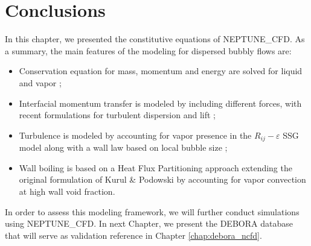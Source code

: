 \section{Conclusions}

In this chapter, we presented the constitutive equations of NEPTUNE\_CFD. As a summary, the main features of the modeling for dispersed bubbly flows are:

\begin{itemize}
\item Conservation equation for mass, momentum and energy are solved for liquid and vapor ;
\item Interfacial momentum transfer is modeled by including different forces, with recent formulations for turbulent dispersion and lift ;
\item Turbulence is modeled by accounting for vapor presence in the $R_{ij}-\varepsilon$ SSG model along with a wall law based on local bubble size ;
\item Wall boiling is based on a Heat Flux Partitioning approach extending the original formulation of Kurul \& Podowski \cite{kurul_multidimensional_1990} by accounting for vapor convection at high wall void fraction.
\end{itemize}

In order to assess this modeling framework, we will further conduct simulations using NEPTUNE\_CFD. In next Chapter, we present the DEBORA database that will serve as validation reference in Chapter \ref{chap:debora_ncfd}.


%

